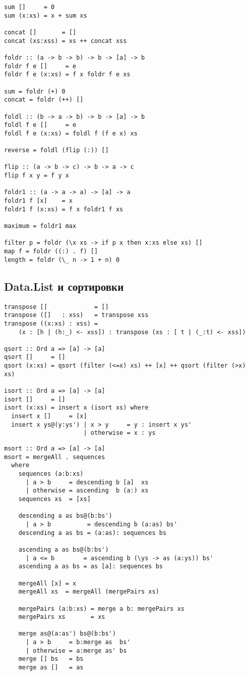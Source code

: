 \documentclass[a4paper,10pt]{article}
\begin{document}
\begin{lstlisting}
sum []     = 0
sum (x:xs) = x + sum xs

concat []       = []
concat (xs:xss) = xs ++ concat xss

foldr :: (a -> b -> b) -> b -> [a] -> b
foldr f e []     = e
foldr f e (x:xs) = f x foldr f e xs

sum = foldr (+) 0
concat = foldr (++) []

foldl :: (b -> a -> b) -> b -> [a] -> b
foldl f e []     = e
foldl f e (x:xs) = foldl f (f e x) xs

reverse = foldl (flip (:)) []

flip :: (a -> b -> c) -> b -> a -> c
flip f x y = f y x

foldr1 :: (a -> a -> a) -> [a] -> a
foldr1 f [x]    = x
foldr1 f (x:xs) = f x foldr1 f xs

maximum = foldr1 max

filter p = foldr (\x xs -> if p x then x:xs else xs) []
map f = foldr ((:) . f) []
length = foldr (\_ n -> 1 + n) 0

\end{lstlisting}

\subsection{Data.List и сортировки}
\begin{lstlisting}
transpose []             = []
transpose ([]   : xss)   = transpose xss
transpose ((x:xs) : xss) =
    (x : [h | (h:_) <- xss]) : transpose (xs : [ t | (_:t) <- xss])

qsort :: Ord a => [a] -> [a]
qsort []     = []
qsort (x:xs) = qsort (filter (<=x) xs) ++ [x] ++ qsort (filter (>x) xs)

isort :: Ord a => [a] -> [a]
isort []     = []
isort (x:xs) = insert x (isort xs) where
  insert x []     = [x]
  insert x ys@(y:ys') | x > y     = y : insert x ys'
                      | otherwise = x : ys
\end{lstlisting}

\clearpage

\begin{lstlisting}
msort :: Ord a => [a] -> [a]
msort = mergeAll . sequences
  where
    sequences (a:b:xs)
      | a > b     = descending b [a]  xs
      | otherwise = ascending  b (a:) xs
    sequences xs  = [xs]

    descending a as bs@(b:bs')
      | a > b          = descending b (a:as) bs'
    descending a as bs = (a:as): sequences bs

    ascending a as bs@(b:bs')
      | a <= b        = ascending b (\ys -> as (a:ys)) bs'
    ascending a as bs = as [a]: sequences bs

    mergeAll [x] = x
    mergeAll xs  = mergeAll (mergePairs xs)

    mergePairs (a:b:xs) = merge a b: mergePairs xs
    mergePairs xs       = xs

    merge as@(a:as') bs@(b:bs')
      | a > b     = b:merge as  bs'
      | otherwise = a:merge as' bs
    merge [] bs   = bs
    merge as []   = as
\end{lstlisting}
\end{document}
